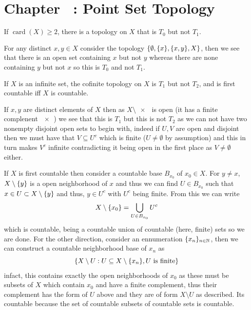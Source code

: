 \documentclass[12pt,a4paper]{article}
\begin{document}
\section*{Chapter \thesection\ : Point Set Topology}
\begin{problem}\label{prob:4-1}
If $\operatorname{card}(X) \ge 2$, there is a topology on $X$ that is $T_0$ but not $T_1$.
\end{problem}
\begin{solution}
    For any distinct $x,y\in X$ consider the topology $\qty{\emptyset,\qty{x},\qty{x,y},X}$, then we see that there is an open set containing $x$ but not $y$ whereas there are none containing $y$ but not $x$ so this is $T_0$ and not $T_1.$
\end{solution}
\begin{problem}\label{prob:4-2}
If $X$ is an infinite set, the cofinite topology on $X$ is $T_1$ but not $T_2$, and is first countable iff $X$ is countable.
\end{problem}
\begin{solution}
If $x,y$ are distinct elements of $X$ then as $X\setminus \qty{x}$ is open (it has a finite complenent $ \qty{x}$) we see that this is $T_1$ but this is not $T_2$ as we can not have two nonempty disjoint open sets to begin with, indeed if $U,V$ are open and disjoint then we must have that $V\subseteq U^c$ which is finite ($U\neq\emptyset$ by assumption) and this in turn makes $V^c$ infinite contradicting it being open in the first place as $V\neq\emptyset$ either. 

If $X$ is first countable then consider a countable base $B_{x_0}$ of $x_0\in X$. 
For $y\neq x$, $X\setminus \qty{y}$ is a open neighborhood of $x$ and thus we can find $U\in B_{x_0}$ such that $x\in U\subset X\setminus \qty{y}$ and thus, $y\in U^c$ with $U^c$ being finite. 
From this we can write 
\[
    X\setminus \qty{x_0} = \bigcup_{U\in B_{x_0}} U^c
\]
which is countable, being a countable union of countable (here, finite) sets so we are done. 
For the other direction, consider an ennumeration $\{x_n\}_{n\in\mathbb{N}}$, then we can construct a countable neighborhood base of $x_n$ as
\[
    \qty{X\setminus U: U \subseteq X\setminus \qty{x_n},U\text{ is finite}}
\]
infact, this contains exactly the open neighborhoods of $x_0$ as these must be subsets of $X$ which contain $x_0$ and have a finite complement, thus their complement has the form of $U$ above and they are of form $X\setminus U$ as described. 
Its countable because the set of countable subsets of countable sets is countable.  
 \end{solution}
\end{document}
